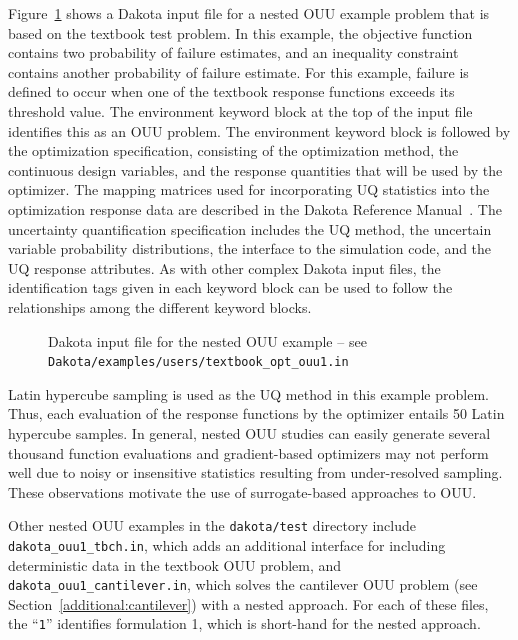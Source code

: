 Figure~\ref{adv_models:figure09} shows a Dakota input file for a nested
OUU example problem that is based on the textbook test problem.
In this example, the objective
function contains two probability of failure estimates, and an
inequality constraint contains another probability of failure
estimate. For this example, failure is defined to occur when one of
the textbook response functions exceeds its threshold value. The
environment keyword block at the top of the input file identifies this as
an OUU problem. The environment keyword block is followed by the
optimization specification, consisting of the optimization method, the
continuous design variables, and the response quantities that will be
used by the optimizer. The mapping matrices used for incorporating UQ
statistics into the optimization response data are described in the
Dakota Reference Manual~\cite{RefMan}. The uncertainty quantification
specification includes the UQ method, the uncertain variable
probability distributions, the interface to the simulation code, and
the UQ response attributes. As with other complex Dakota input files,
the identification tags given in each keyword block can be used to
follow the relationships among the different keyword blocks.

\begin{figure}
  \centering
  \begin{bigbox}
    \begin{tiny}
    \end{tiny}
  \end{bigbox}
  \caption{Dakota input file for the nested OUU example --
see \texttt{Dakota/examples/users/textbook\_opt\_ouu1.in} }
  \label{adv_models:figure09}
\end{figure}

Latin hypercube sampling is used as the UQ method in this example
problem. Thus, each evaluation of the response functions by the
optimizer entails 50 Latin hypercube samples. In general, nested OUU
studies can easily generate several thousand function evaluations and
gradient-based optimizers may not perform well due to noisy or
insensitive statistics resulting from under-resolved sampling. These
observations motivate the use of surrogate-based approaches to OUU.

Other nested OUU examples in the \texttt{dakota/test} directory
include \texttt{dakota\_ouu1\_tbch.in}, which adds an additional
interface for including deterministic data in the textbook OUU
problem, and\\ \texttt{dakota\_ouu1\_cantilever.in}, which solves the
cantilever OUU problem (see Section~\ref{additional:cantilever}) with
a nested approach. For each of these files, the ``\texttt{1}''
identifies formulation 1, which is short-hand for the nested approach.

